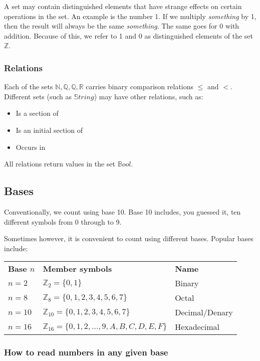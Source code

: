 \documentclass{article}
\begin{document}
A set may contain distinguished elements that have strange effects on certain operations in the set. An example is the number 1. If we multiply {\it something} by 1, then the result will always be the same {\it something}. The same goes for 0 with addition. Because of this, we refer to 1 and 0 as distinguished elements of the set $\mathbb{Z}$.

\subsubsection{Relations}

Each of the sets $\mathbb{N, Q, Q, R}$ carries binary comparison relations $\leq$ and $<$. Different sets (such as $\mathbb{S}tring$) may have other relations, such as:

\begin{itemize}
	\item Is a section of
	\item Is an initial section of
	\item Occurs in
\end{itemize}

All relations return values in the set $\mathbb{B}ool$.

\subsection{Bases}

Conventionally, we count using base 10. Base 10 includes, you guessed it, ten different symbols from 0 through to 9.

Sometimes however, it is convenient to count using different bases. Popular bases include:

\begin{tabular}{l l l}
	{\bf Base $n$} & {\bf Member symbols} & {\bf Name}\\
	$n = 2$ & $\mathbb{Z}_2 = \{0, 1\}$ & Binary\\
	$n = 8$ & $\mathbb{Z}_8 = \{0, 1, 2, 3, 4, 5, 6, 7\}$ & Octal\\
	$n = 10$ & $\mathbb{Z}_{10} = \{0, 1, 2, 3, 4, 5, 6, 7\}$ & Decimal/Denary\\
	$n = 16$ & $\mathbb{Z}_{16} = \{0, 1, 2, \ldots ,9, A, B, C, D, E, F\}$ & Hexadecimal\\
\end{tabular}

\subsubsection{How to read numbers in any given base}
\end{document}

